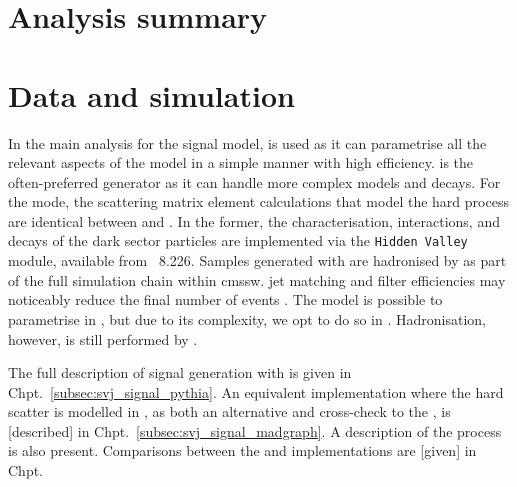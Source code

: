 



\section{Analysis summary}
\label{sec:svj_overview}




\section{Data and simulation}
\label{sec:svj_data_sim}

In the main analysis for the \schannel signal model, \PYTHIA is used as it can parametrise all the relevant aspects of the model in a simple manner with high efficiency. \MADGRAPH is the often-preferred generator as it can handle more complex models and decays. For the \schannel mode, the scattering matrix element calculations that model the hard process are identical between \PYTHIA and \MADGRAPH. In the former, the characterisation, interactions, and decays of the dark sector particles are implemented via the \texttt{Hidden Valley} module, available from \PYTHIA~8.226. Samples generated with \MADGRAPH are hadronised by \PYTHIA as part of the full simulation chain within \acrshort{cmssw}. \Gls{jet} matching and filter efficiencies may noticeably reduce the final number of events . The \tchannel model is possible to parametrise in \PYTHIA, but due to its complexity, we opt to do so in \MADGRAPH. Hadronisation, however, is still performed by \PYTHIA. %

The full description of \schannel signal generation with \PYTHIAEIGHT is given in Chpt.~\ref{subsec:svj_signal_pythia}. An equivalent implementation where the hard scatter is modelled in \MGvATNLO, as both an alternative and cross-check to the \PYTHIA [version], is [described] in Chpt.~\ref{subsec:svj_signal_madgraph}. A description of the \tchannel process is also present. Comparisons between the \PYTHIA and \MADGRAPH implementations are [given] in Chpt.{}


